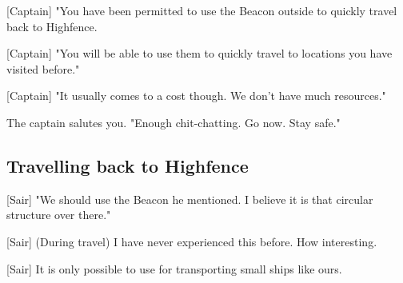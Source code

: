 \documentclass[a4paper,12pt]{article}
\begin{document}
[Captain] "You have been permitted to use the Beacon outside to quickly travel back to Highfence. 

[Captain] "You will be able to use them to quickly travel to locations you have visited before." 

[Captain] "It usually comes to a cost though. We don't have much resources."

The captain salutes you. "Enough chit-chatting. Go now. Stay safe."

\subsection{Travelling back to Highfence}

[Sair] "We should use the Beacon he mentioned. I believe it is that circular
structure over there."

[Sair] (During travel) I have never experienced this before. How interesting.

[Sair] It is only possible to use for transporting small ships like ours.
\end{document}
